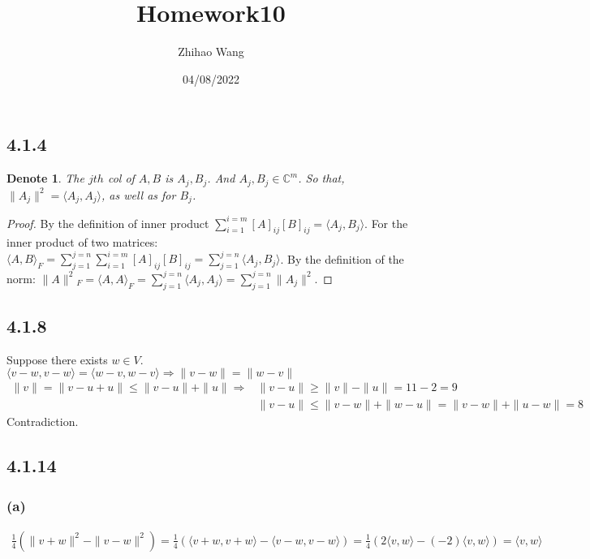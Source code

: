 \documentclass{article}
\title{Homework10}
\author{Zhihao Wang}
\date{04/08/2022}
\newtheorem*{denote}{Denote}
\newtheorem*{proof}{Proof}
\begin{document}
\maketitle 


\subsection*{4.1.4}
\begin{denote}
    The $jth$ col of $A, B$ is $A_j, B_j$. And $A_j, B_j \in \mathbb{C}^m$. So that, $\|A_j\|^2 = \langle A_j, A_j\rangle$, as well as for $B_j$.
\end{denote}
\begin{proof}
    By the definition of inner product $\sum_{i=1}^{i=m} [A]_{ij}[B]_{ij} =\langle A_j, B_j \rangle$.
    For the inner product of two matrices: $\langle A, B\rangle _{F} =\sum_{j=1}^{j=n} \sum_{i=1}^{i=m} [A]_{ij}[B]_{ij} =\sum_{j=1}^{j=n} \langle A_j, B_j \rangle$. 
    By the definition of the norm: $\|A\|^2 {_F}  = \langle A, A \rangle _F = \sum_{j=1}^{j=n} \langle A_j, A_j \rangle = \sum_{j=1}^{j=n}\|A_j\|^2$.
\end{proof}

\subsection*{4.1.8}
\noindent Suppose there exists $w \in V$. $\langle v - w, v - w \rangle = \langle w - v, w - v \rangle \Rightarrow \|v - w\| = \|w - v\|$
\begin{equation*}
    \begin{split}
          \|v\| = \|v - u + u\| \le \|v - u\| + \|u\| \Rightarrow &\|v - u\| \ge \|v\| - \|u\| = 11 - 2 = 9 \\
        & \|v - u\| \le \|v-w\| + \|w - u\| = \|v-w\| + \|u - w\| = 8
    \end{split}
\end{equation*}
Contradiction.

\subsection*{4.1.14}
\subsubsection*{(a)}
\begin{equation*}
    \begin{split}
        \frac 1 4 (\|v + w\|^2 - \|v - w\|^2) = \frac 1 4 (\langle v+w, v+w\rangle - \langle v-w, v-w \rangle) = \frac 1 4(2 \langle v, w \rangle - (-2) \langle v, w \rangle) = \langle v, w \rangle
    \end{split}
\end{equation*}
\end{document}

